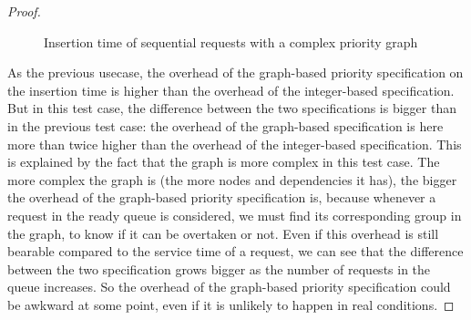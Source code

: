 \documentclass[11pt]{report}
\begin{document}
\begin{proof}
\begin{figure}[!ht]
      \caption{Insertion time of sequential requests with a complex priority graph}
      \label{fig:sequential} 
\end{figure}

As the previous usecase, the overhead of the graph-based priority specification on the insertion time is higher than the overhead of the integer-based specification. But in this test case, the difference between the two specifications is bigger than in the previous test case: the overhead of the graph-based specification is here more than twice higher than the overhead of the integer-based specification.
This is explained by the fact that the graph is more complex in this test case. The more complex the graph is (the more nodes and dependencies it has), the bigger the overhead of the graph-based priority specification is, because whenever a request in the ready queue is considered, we must find its corresponding group in the graph, to know if it can be overtaken or not.
Even if this overhead is still bearable compared to the service time of a request, we can see that the difference between the two specification grows bigger as the number of requests in the queue increases. So the overhead of the graph-based priority specification could be awkward at some point, even if it is unlikely to happen in real conditions.


\end{proof}
\end{document}
